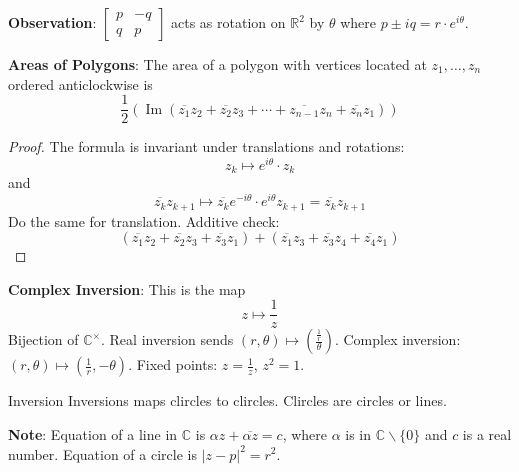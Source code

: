 \documentclass{report}
\begin{document}
\textbf{Observation}: $\begin{bmatrix}
    p &  -q \\
    q & p     
\end{bmatrix}$ acts as rotation on $\mathbb{R}^{2}$ by $\theta$ where $p \pm iq = r \cdot e^{i \theta}$.

\textbf{Areas of Polygons}: The area of a polygon with vertices located at $z_{1}, \ldots, z_{n}$ ordered anticlockwise is
    \begin{equation*}
        \dfrac{1}{2}(\mathop{Im}(\overline{z_{1}}z_{2} + \overline{z_{2}}z_{3} + \cdots + \overline{z_{n - 1}}z_{n} + \overline{z_{n}}z_{1}))
    \end{equation*}
\begin{proof}
    The formula is invariant under translations and rotations:
        \begin{equation*}
            z_{k} \mapsto e^{i \theta} \cdot z_{k}
        \end{equation*}
    and 
        \begin{equation*}
            \overline{z_{k}}z_{k + 1} \mapsto \overline{z_{k}}e^{-i\theta}\cdot e^{i \theta} z_{k + 1} = \overline{z_{k}}z_{k + 1}
        \end{equation*}
    Do the same for translation. Additive check:
        \begin{equation*}
            (\overline{z_{1}}z_{2} + \overline{z_{2}}z_{3} + \overline{z_{3}}z_{1}) + (\overline{z_{1}}z_{3} + \overline{z_{3}}z_{4} + \overline{z_{4}}z_{1})
        \end{equation*}
\end{proof}

\textbf{Complex Inversion}: This is the map
    \begin{equation*}
        z \mapsto \dfrac{1}{z}
    \end{equation*}
Bijection of $\mathbb{C}^{\times}$. Real inversion sends $(r, \theta) \mapsto (\frac{\frac{1}{r}}{\theta})$. Complex inversion: $(r, \theta) \mapsto (\frac{1}{r}, -\theta)$. Fixed points: $z = \frac{1}{z}$, $z^{2} = 1$.

\begin{theorem}{Inversion}
    Inversions maps clircles to clircles. Clircles are circles or lines.
\end{theorem}

\textbf{Note}: Equation of a line in $\mathbb{C}$ is $\alpha z + \overline{ \alpha z} = c$, where $\alpha$ is in $\mathbb{C} \backslash \{0\}$ and $c$ is a real number. Equation of a circle is $\lvert z - p \rvert^{2} = r^{2}$.
\end{document}
